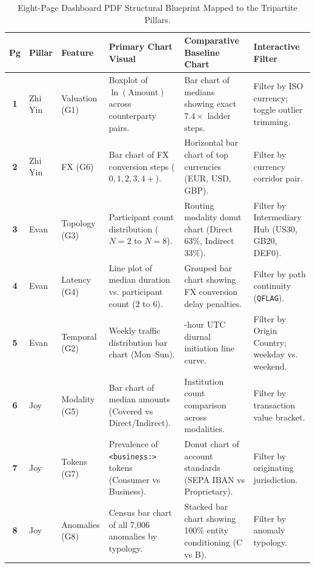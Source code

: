 \documentclass[11pt,a4paper]{article}
\begin{document}
\begin{table}[H]
\centering\footnotesize
\caption{Eight-Page Dashboard PDF Structural Blueprint Mapped to the Tripartite Pillars.}
\label{tab:dashboard_blueprint}
\renewcommand{\arraystretch}{1.25}
\begin{tabularx}{\textwidth}{@{}c >{\raggedright\arraybackslash}p{1.8cm} >{\raggedright\arraybackslash}p{2.2cm} >{\raggedright\arraybackslash}p{3.8cm} >{\raggedright\arraybackslash}p{3.8cm} >{\raggedright\arraybackslash}X@{}}
\toprule
\textbf{Pg} & \textbf{Pillar} & \textbf{Feature} & \textbf{Primary Chart Visual} & \textbf{Comparative Baseline Chart} & \textbf{Interactive Filter} \\ \midrule
\textbf{1} & Zhi Yin & Valuation (G1) & Boxplot of $\ln(\text{Amount})$ across counterparty pairs. & Bar chart of medians showing exact $7.4\times$ ladder steps. & Filter by ISO currency; toggle outlier trimming. \\
\textbf{2} & Zhi Yin & FX (G6) & Bar chart of FX conversion steps ($0, 1, 2, 3, 4+$). & Horizontal bar chart of top currencies (EUR, USD, GBP). & Filter by currency corridor pair. \\
\textbf{3} & Evan & Topology (G3) & Participant count distribution ($N=2$ to $N=8$). & Routing modality donut chart (Direct 63\%, Indirect 33\%). & Filter by Intermediary Hub (US30, GB20, DEF0). \\
\textbf{4} & Evan & Latency (G4) & Line plot of median duration vs. participant count ($2$ to $6$). & Grouped bar chart showing FX conversion delay penalties. & Filter by path continuity (\texttt{QFLAG}). \\
\textbf{5} & Evan & Temporal (G2) & Weekly traffic distribution bar chart (Mon--Sun). & 24-hour UTC diurnal initiation line curve. & Filter by Origin Country; weekday vs. weekend. \\
\textbf{6} & Joy & Modality (G5) & Bar chart of median amounts (Covered vs Direct/Indirect). & Institution count comparison across modalities. & Filter by transaction value bracket. \\
\textbf{7} & Joy & Tokens (G7) & Prevalence of \texttt{<business:>} tokens (Consumer vs Business). & Donut chart of account standards (SEPA IBAN vs Proprietary). & Filter by originating jurisdiction. \\
\textbf{8} & Joy & Anomalies (G8) & Census bar chart of all 7,006 anomalies by typology. & Stacked bar chart showing 100\% entity conditioning (C vs B). & Filter by anomaly typology. \\ \bottomrule
\end{tabularx}
\end{table}
\end{document}
